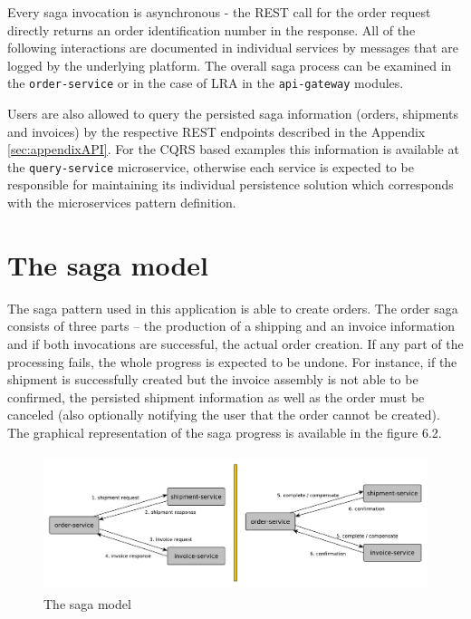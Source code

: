 \documentclass[oneside,
  digital, %
  table,   %
  nolof,     %
  nolot,     %
]{fithesis3}
\begin{document}
Every saga invocation is asynchronous - the REST call for the order request directly returns an order identification number in the response. All of the following interactions are documented in individual services by messages that are logged by the underlying platform. The overall saga process can be examined in the \texttt{order-service} or in the case of LRA in the \texttt{api-gateway} modules.

Users are also allowed to query the persisted saga information (orders, shipments and invoices) by the respective REST endpoints described in the Appendix \ref{sec:appendixAPI}. For the CQRS based examples this information is available at the \texttt{query-service} microservice, otherwise each service is expected to be responsible for maintaining its individual persistence solution which corresponds with the microservices pattern definition.

\section{The saga model}

The saga pattern used in this application is able to create orders. The order saga consists of three parts -- the production of a shipping and an invoice information and if both invocations are successful, the actual order creation. If any part of the processing fails, the whole progress is expected to be undone. For instance, if the shipment is successfully created but the invoice assembly is not able to be confirmed, the persisted shipment information as well as the order must be canceled (also optionally notifying the user that the order cannot be created). The graphical representation of the saga progress is available in the figure 6.2.

\begin{figure}
    \begin{center}
        \includegraphics[height=40mm]{images/sagaModel.pdf}
    \end{center}
    \caption{The saga model}
\end{figure}
\end{document}
